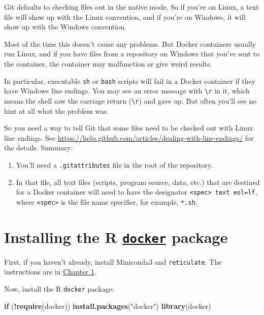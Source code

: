 \documentclass[]{book}
\newenvironment{Shaded}{\begin{snugshade}}{\end{snugshade}}
\newcommand{\ControlFlowTok}[1]{\textcolor[rgb]{0.13,0.29,0.53}{\textbf{#1}}}
\newcommand{\KeywordTok}[1]{\textcolor[rgb]{0.13,0.29,0.53}{\textbf{#1}}}
\newcommand{\NormalTok}[1]{#1}
\newcommand{\OperatorTok}[1]{\textcolor[rgb]{0.81,0.36,0.00}{\textbf{#1}}}
\newcommand{\StringTok}[1]{\textcolor[rgb]{0.31,0.60,0.02}{#1}}
\providecommand{\tightlist}{%
  \setlength{\itemsep}{0pt}\setlength{\parskip}{0pt}}
\theoremstyle{definition}
\theoremstyle{definition}
\theoremstyle{definition}
\theoremstyle{remark}
\begin{document}
Git defaults to checking files out in the native mode. So if you're on
Linux, a text file will show up with the Linux convention, and if you're
on Windows, it will show up with the Windows convention.

Most of the time this doesn't cause any problems. But Docker containers
usually run Linux, and if you have files from a repository on Windows
that you've sent to the container, the container may malfunction or give
weird results.

In particular, executable \texttt{sh} or \texttt{bash} scripts will fail
in a Docker container if they have Windows line endings. You may see an
error message with \texttt{\textbackslash{}r} in it, which means the
shell saw the carriage return (\texttt{\textbackslash{}r}) and gave up.
But often you'll see no hint at all what the problem was.

So you need a way to tell Git that some files need to be checked out
with Linux line endings. See
\url{https://help.github.com/articles/dealing-with-line-endings/} for
the details. Summary:

\begin{enumerate}
\def\labelenumi{\arabic{enumi}.}
\tightlist
\item
  You'll need a \texttt{.gitattributes} file in the root of the
  repository.
\item
  In that file, all text files (scripts, program source, data, etc.)
  that are destined for a Docker container will need to have the
  designator \texttt{\textless{}spec\textgreater{}\ text\ eol=lf}, where
  \texttt{\textless{}spec\textgreater{}} is the file name specifier, for
  example, \texttt{*.sh}.
\end{enumerate}

\hypertarget{installing-the-r-docker-package}{%
\section{\texorpdfstring{Installing the R
\href{https://bhaskarvk.github.io/docker/}{\texttt{docker}}
package}{Installing the R docker package}}\label{installing-the-r-docker-package}}

First, if you haven't already, install Miniconda3 and
\texttt{reticulate}. The instructions are in
\protect\hyperlink{miniconda-installation}{Chapter 1}.

Now, install the R \texttt{docker} package:

\begin{Shaded}
\begin{Highlighting}[]
\ControlFlowTok{if}\NormalTok{ (}\OperatorTok{!}\KeywordTok{require}\NormalTok{(docker)) }\KeywordTok{install.packages}\NormalTok{(}\StringTok{"docker"}\NormalTok{)}
\KeywordTok{library}\NormalTok{(docker)}
\end{Highlighting}
\end{Shaded}
\end{document}
